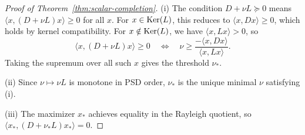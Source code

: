 
\begin{proof}[Proof of Theorem~\ref{thm:scalar-completion}]
\label{proof:thm:scalar-completion}
(i) The condition $D + \nu L \succeq 0$ means $\langle x, (D + \nu L) x \rangle \ge 0$ for all $x$.
For $x \in \mathrm{Ker}(L)$, this reduces to $\langle x, D x \rangle \ge 0$, which holds by kernel compatibility.
For $x \notin \mathrm{Ker}(L)$, we have $\langle x, L x \rangle > 0$, so
\[
\langle x, (D + \nu L) x \rangle \ge 0
\quad\Leftrightarrow\quad
\nu \ge \frac{-\langle x, D x \rangle}{\langle x, L x \rangle}.
\]
Taking the supremum over all such $x$ gives the threshold $\nu_*$.

(ii) Since $\nu \mapsto \nu L$ is monotone in PSD order, $\nu_*$ is the unique minimal $\nu$ satisfying (i).

(iii) The maximizer $x_*$ achieves equality in the Rayleigh quotient, so $\langle x_*, (D + \nu_* L) x_* \rangle = 0$.
\end{proof}
